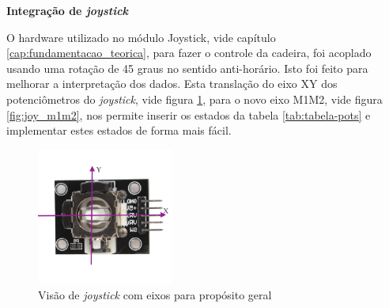     \begin{table}[!ht]
    \centering
    \caption{Intensidade e direção dos motores conforme estado. Asteriscos simbolizam motor sem direção}
    \label{tab:tabela-pots2}
    \end{table}

    \textbf{Integração de \textit{joystick}}

    O hardware utilizado no módulo Joystick, vide capítulo \ref{cap:fundamentacao_teorica}, para fazer o controle da cadeira, foi acoplado usando uma rotação de 45 graus no sentido anti-horário. Isto foi feito para melhorar a interpretação dos dados. Esta translação do eixo XY dos potenciômetros do \textit{joystick}, vide figura \ref{fig:joy_superior}, para o novo eixo M1M2, vide figura \ref{fig:joy_m1m2}, nos permite inserir os estados da tabela \ref{tab:tabela-pots} e implementar estes estados de forma mais fácil.

    \begin{figure}[!ht]
      \center
      \includegraphics[width=0.4\textwidth]{figuras/resultados/joy_xy}
      \caption{Visão de \textit{joystick} com eixos para propósito geral}
      \label{fig:joy_superior}
    \end{figure}

